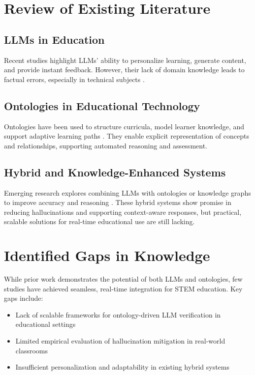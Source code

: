 \section{Review of Existing Literature}

\subsection{LLMs in Education}
Recent studies highlight LLMs' ability to personalize learning, generate content, and provide instant feedback. However, their lack of domain knowledge leads to factual errors, especially in technical subjects \cite{ji2023survey, su2024confabulation, huang2024survey}.

\subsection{Ontologies in Educational Technology}
Ontologies have been used to structure curricula, model learner knowledge, and support adaptive learning paths \cite{sage2024ontological, medium2024hallucination, sage2021stem}. They enable explicit representation of concepts and relationships, supporting automated reasoning and assessment.

\subsection{Hybrid and Knowledge-Enhanced Systems}
Emerging research explores combining LLMs with ontologies or knowledge graphs to improve accuracy and reasoning \cite{hartl2024knowledge, scibite2024ontologies, nananukul2023halo}. These hybrid systems show promise in reducing hallucinations and supporting context-aware responses, but practical, scalable solutions for real-time educational use are still lacking.


\section{Identified Gaps in Knowledge}

While prior work demonstrates the potential of both LLMs and ontologies, few studies have achieved seamless, real-time integration for STEM education. Key gaps include:
\begin{itemize}
    \item Lack of scalable frameworks for ontology-driven LLM verification in educational settings
    \item Limited empirical evaluation of hallucination mitigation in real-world classrooms
    \item Insufficient personalization and adaptability in existing hybrid systems
\end{itemize}

